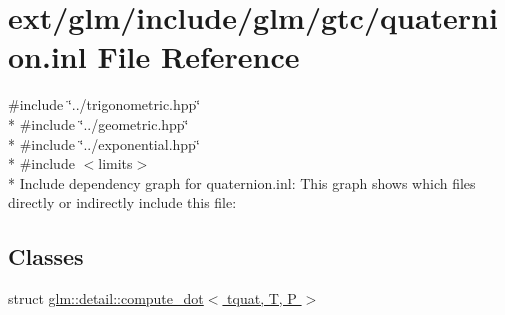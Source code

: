 \hypertarget{glm_2include_2glm_2gtc_2quaternion_8inl}{\section{ext/glm/include/glm/gtc/quaternion.inl File Reference}
\label{glm_2include_2glm_2gtc_2quaternion_8inl}
}
{\ttfamily \#include \char`\"{}../trigonometric.\-hpp\char`\"{}}\\*
{\ttfamily \#include \char`\"{}../geometric.\-hpp\char`\"{}}\\*
{\ttfamily \#include \char`\"{}../exponential.\-hpp\char`\"{}}\\*
{\ttfamily \#include $<$limits$>$}\\*
Include dependency graph for quaternion.\-inl\-:
This graph shows which files directly or indirectly include this file\-:
\subsection*{Classes}
\begin{DoxyCompactItemize}
\item 
struct \hyperlink{structglm_1_1detail_1_1compute__dot_3_01tquat_00_01_t_00_01_p_01_4}{glm\-::detail\-::compute\-\_\-dot$<$ tquat, T, P $>$}
\end{DoxyCompactItemize}
